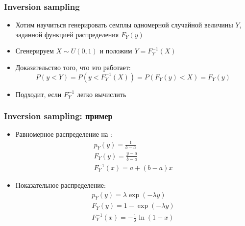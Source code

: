 \documentclass[10pt]{beamer}
\begin{document}
\begin{frame}[fragile]
\frametitle{Inversion sampling}
\begin{itemize}
\item Хотим научиться генерировать семплы одномерной случайной величины \begin{math}Y\end{math}, заданной функцией распределения \begin{math}F_Y(y)\end{math}
\pause
\item Сгенерируем \begin{math}X\sim U(0,1)\end{math} и положим \begin{math}Y = F_Y^{-1}(X)\end{math}
\pause
\item Доказательство того, что это работает:
\begin{equation*}
P(y < Y) = P(y < F_Y^{-1}(X)) = P(F_Y(y) < X) = F_Y(y)
\end{equation*}
\pause
\item Подходит, если \begin{math}F_Y^{-1}\end{math} легко вычислить
\end{itemize}
\end{frame}

\begin{frame}[fragile]
\frametitle{Inversion sampling: пример}
\begin{itemize}
\item Равномерное распределение на \begin{math}[a, b]\end{math}:
\begin{gather*}
p_Y(y) = \frac{1}{b-a} \\
F_Y(y) = \frac{y-a}{b-a} \\
F_Y^{-1}(x) = a + (b-a)x
\end{gather*}
\pause
\item Показательное распределение:
\begin{gather*}
p_Y(y) = \lambda\exp(-\lambda y) \\
F_Y(y) = 1 - \exp(-\lambda y) \\
F_Y^{-1}(x) = -\frac{1}{\lambda}\ln(1-x)
\end{gather*}
\end{itemize}
\end{frame}
\end{document}

